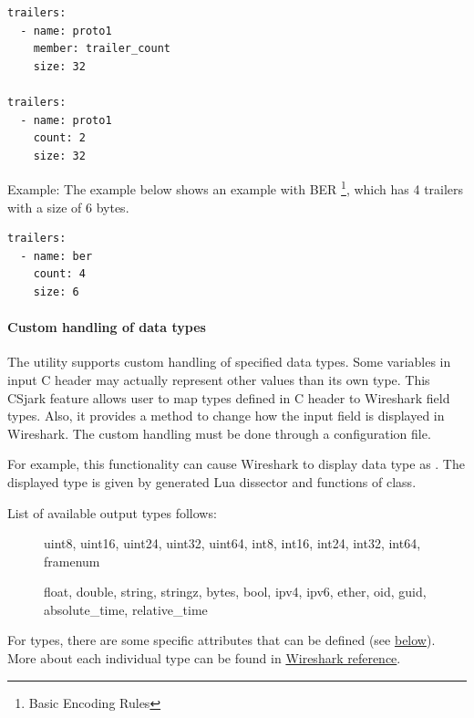 \documentclass[A4paper,10pt,english]{sphinxmanual}
\begin{document}
\begin{Verbatim}[commandchars=\\\{\}]
trailers:
  - name: proto1
    member: trailer_count
    size: 32

trailers:
  - name: proto1
    count: 2
    size: 32
\end{Verbatim}

Example:
The example below shows an example with BER \footnote{
Basic Encoding Rules
}, which has 4 trailers with a size of 6 bytes.

\begin{Verbatim}[commandchars=\\\{\}]
trailers:
  - name: ber
    count: 4
    size: 6
\end{Verbatim}


\paragraph{Custom handling of data types}
\label{user/config:custom-handling-of-data-types}
The utility supports custom handling of specified data types. Some variables in input C header may actually represent other values than its own type. This CSjark feature allows user to map types defined in C header to Wireshark field types. Also, it provides a method to change how the input field is displayed in Wireshark. The custom handling must be done through a configuration file.

For example, this functionality can cause Wireshark to display  data type as . The displayed type is given by generated Lua dissector and functions of  class.

List of available output types follows:
\begin{description}
\item[{}] \leavevmode
uint8, uint16, uint24, uint32, uint64, int8, int16, int24, int32, int64, framenum

\item[{}] \leavevmode
float, double, string, stringz, bytes, bool, ipv4, ipv6, ether, oid, guid, absolute\_time, relative\_time

\end{description}

For  types, there are some specific attributes that can be defined (see {\hyperref[user/config:below]{below}}). More about each individual type can be found in \href{http://www.wireshark.org/docs/wsug\_html\_chunked/lua\_module\_Proto.html\#lua\_class\_ProtoField}{Wireshark reference}.
\end{document}
